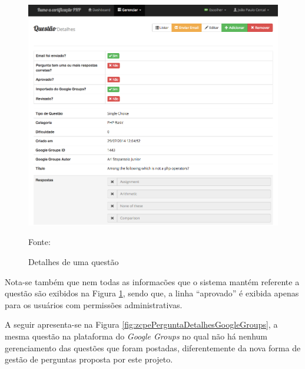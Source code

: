\begin{figure}[h!tb]
	\caption{Detalhes de uma questão}
	\label{fig:zcpePerguntaDetalhes}

	\centering
	\includegraphics[width=\textwidth]{images/resultados/zcpe-pergunta-detalhes.png}

	\centering
	\footnotesize Fonte: \fonteOAutor
\end{figure}

\FloatBarrier 	%

Nota-se também que nem todas as informacões que o sistema mantém referente a
questão são exibidos na Figura \ref{fig:zcpePerguntaDetalhes}, sendo que, a
linha ``aprovado'' é exibida apenas para os usuários com permissões
administrativas.

A seguir apresenta-se na Figura \ref{fig:zcpePerguntaDetalhesGoogleGroups}, a
mesma questão na plataforma do \textit{Google Groups} no qual não há nenhum gerenciamento das questões que
foram postadas, diferentemente da nova forma de gestão de perguntas proposta por
este projeto.


